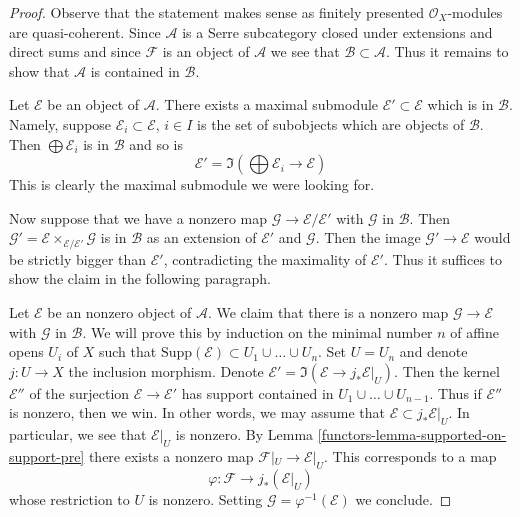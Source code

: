 \begin{proof}

Observe that the statement makes sense as finitely presented
$\mathcal{O}_X$-modules are quasi-coherent.
Since $\mathcal{A}$ is a Serre subcategory closed under extensions and
direct sums and since $\mathcal{F}$ is an object of $\mathcal{A}$
we see that $\mathcal{B} \subset \mathcal{A}$. Thus it remains to
show that $\mathcal{A}$ is contained in $\mathcal{B}$.

\medskip\noindent
Let $\mathcal{E}$ be an object of $\mathcal{A}$. There exists
a maximal submodule $\mathcal{E}' \subset \mathcal{E}$
which is in $\mathcal{B}$. Namely, suppose
$\mathcal{E}_i \subset \mathcal{E}$, $i \in I$ is the set of
subobjects which are objects of $\mathcal{B}$. Then
$\bigoplus \mathcal{E}_i$ is in $\mathcal{B}$ and so is
$$
\mathcal{E}' = \Im(\bigoplus \mathcal{E}_i \longrightarrow \mathcal{E})
$$
This is clearly the maximal submodule we were looking for.

\medskip\noindent
Now suppose that we have a nonzero map
$\mathcal{G} \to \mathcal{E}/\mathcal{E}'$
with $\mathcal{G}$ in $\mathcal{B}$. Then
$\mathcal{G}' = \mathcal{E} \times_{\mathcal{E}/\mathcal{E}'} \mathcal{G}$
is in $\mathcal{B}$ as an extension of $\mathcal{E}'$ and $\mathcal{G}$.
Then the image $\mathcal{G}' \to \mathcal{E}$ would be strictly
bigger than $\mathcal{E}'$, contradicting the maximality of $\mathcal{E}'$.
Thus it suffices to show the claim in the following paragraph.

\medskip\noindent
Let $\mathcal{E}$ be an nonzero object of $\mathcal{A}$. We claim that there
is a nonzero map $\mathcal{G} \to \mathcal{E}$ with $\mathcal{G}$ in
$\mathcal{B}$. We will prove this by induction on the minimal
number $n$ of affine opens $U_i$ of $X$ such that
$\text{Supp}(\mathcal{E}) \subset U_1 \cup \ldots \cup U_n$.
Set $U = U_n$ and denote $j : U \to X$ the inclusion morphism.
Denote $\mathcal{E}' = \Im(\mathcal{E} \to j_*\mathcal{E}|_U)$.
Then the kernel $\mathcal{E}''$ of the surjection
$\mathcal{E} \to \mathcal{E}'$ has support contained in
$U_1 \cup \ldots \cup U_{n - 1}$. Thus if $\mathcal{E}''$ is nonzero,
then we win. In other words, we may assume that
$\mathcal{E} \subset j_*\mathcal{E}|_U$.
In particular, we see that $\mathcal{E}|_U$ is nonzero.
By Lemma \ref{functors-lemma-supported-on-support-pre}
there exists a nonzero map $\mathcal{F}|_U \to \mathcal{E}|_U$.
This corresponds to a map
$$
\varphi : \mathcal{F} \longrightarrow j_*(\mathcal{E}|_U)
$$
whose restriction to $U$ is nonzero.
Setting $\mathcal{G} = \varphi^{-1}(\mathcal{E})$ we conclude.
\end{proof}


